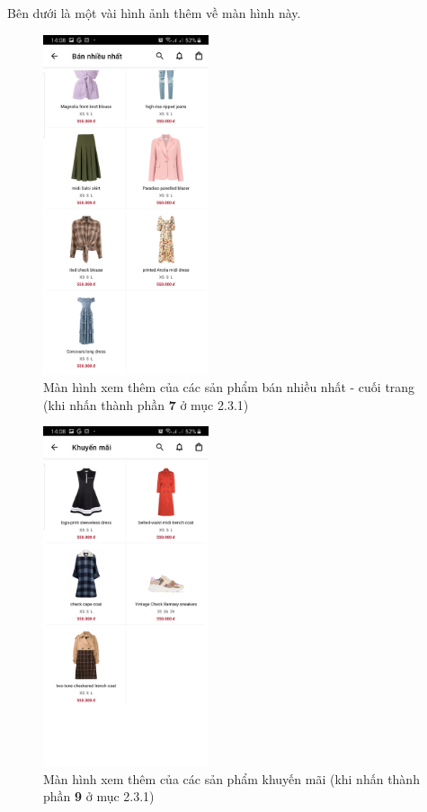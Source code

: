 \documentclass[12pt]{article}
\begin{document}
\newpage
\indent Bên dưới là một vài hình ảnh thêm về màn hình này.

\begin{figure}[H]
    \centering
    \includegraphics[height=10cm]{images/16.png}
    \caption{Màn hình xem thêm của các sản phẩm bán nhiều nhất - cuối trang (khi nhấn thành phần \textbf{7} ở mục 2.3.1)}
\end{figure}

\begin{figure}[H]
    \centering
    \includegraphics[height=10cm]{images/17.png}
    \caption{Màn hình xem thêm của các sản phẩm khuyến mãi (khi nhấn thành phần \textbf{9} ở mục 2.3.1)}
\end{figure}
\end{document}
